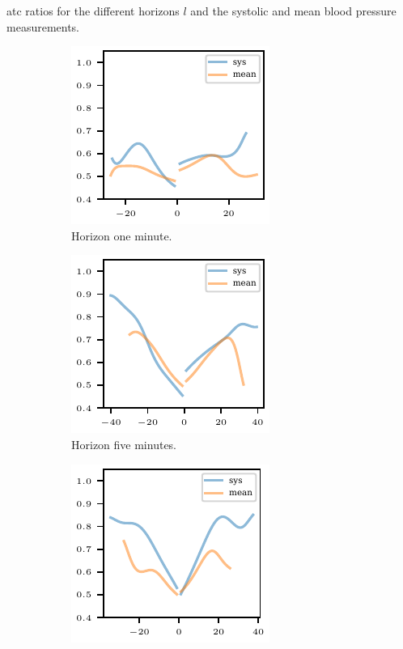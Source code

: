\documentclass[pdflatex]{sn-jnl}
\theoremstyle{plain}%
\theoremstyle{definition}
\begin{document}
\begin{table}
    \centering
    
    \caption[ATC ratios for the different horizons $l$ and the systolic and mean blood pressure measurements.]{\Ac{atc} ratios for the different horizons $l$ and the systolic and mean blood pressure measurements.}
    \label{tab:app-mimic-atc-ratios}
\end{table}

\begin{figure}
    \centering
    \begin{subfigure}[t]{.32\textwidth}
        \includegraphics{plots/mimic/cond_prob_diff_nbp_abp_lag1}
        \caption{Horizon one minute.}
    \end{subfigure}\hspace{0.01\textwidth}
    \begin{subfigure}[t]{.32\textwidth}
        \includegraphics{plots/mimic/cond_prob_diff_nbp_abp_lag5}
        \caption{Horizon five minutes.}
    \end{subfigure}\hspace{0.01\textwidth}
    \begin{subfigure}[t]{.32\textwidth}
        \includegraphics{plots/mimic/cond_prob_diff_nbp_abp_lag15}

\end{subfigure}
\end{figure}
\end{document}
